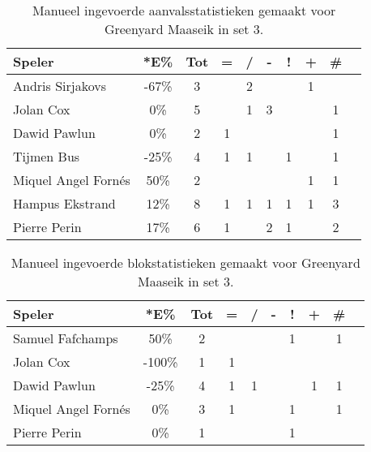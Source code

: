 \begin{table}[ht!]
    \centering
    \scriptsize
    \begin{tabular}{|l|c|c|c|c|c|c|c|c|c|} \hline
        \textbf{Speler} & *E\% & Tot & = & / & - & ! & + & \#\\ \hline
        Andris Sirjakovs & -67\% & 3 &  & 2 &  &  & 1 &  \\ 
        Jolan Cox & 0\% & 5 &  & 1 & 3 &  &  & 1 \\ 
        Dawid Pawlun & 0\% & 2 & 1 &  &  &  &  & 1 \\ 
        Tijmen Bus & -25\% & 4 & 1 & 1 &  & 1 &  & 1 \\ 
        Miquel Angel Fornés & 50\% & 2 &  &  &  &  & 1 & 1 \\ 
        Hampus Ekstrand & 12\% & 8 & 1 & 1 & 1 & 1 & 1 & 3 \\ 
        Pierre Perin  & 17\% & 6 & 1 &  & 2 & 1 &  & 2 \\ \hline
    \end{tabular}
   \caption[Manueel ingevoerde aanvalsstatistieken gemaakt Greenyard Maaseik in set 3]{\label{tab:PL1AttMaaseikMan3}Manueel ingevoerde aanvalsstatistieken gemaakt voor Greenyard Maaseik in set 3.}
\end{table}

\begin{table}[ht!]
    \centering
    \scriptsize
    \begin{tabular}{|l|c|c|c|c|c|c|c|c|c|} \hline
        \textbf{Speler} & *E\% & Tot & = & / & - & ! & + & \#\\ \hline
        Samuel Fafchamps & 50\% & 2 &  &  &  & 1 &  & 1 \\ 
        Jolan Cox & -100\% & 1 & 1 &  &  &  &  &  \\
        Dawid Pawlun & -25\% & 4 & 1 & 1 &  &  & 1 & 1 \\
        Miquel Angel Fornés & 0\% & 3 & 1 &  &  & 1 &  & 1 \\ 
        Pierre Perin & 0\% & 1 &  &  &  & 1 &  &  \\ \hline
    \end{tabular}
    \caption[Manueel ingevoerde blokstatistieken gemaakt Greenyard Maaseik in set 3]{\label{tab:PL1BlockMaaseikMan3}Manueel ingevoerde blokstatistieken gemaakt voor Greenyard Maaseik in set 3.}
\end{table}

